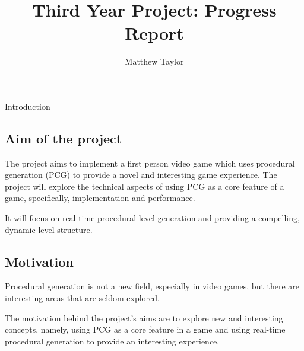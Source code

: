 \documentclass[progress]{cmpreport}
\title{Third Year Project: Progress Report}
\author{Matthew Taylor}
\begin{document}
\maketitle

\begin{section}{Introduction}

\subsection{Aim of the project}
The project aims to implement a first person video game which uses procedural generation (PCG) to provide a novel and interesting game experience. The project will explore the technical aspects of using PCG as a core feature of a game, specifically, implementation and performance. 

It will focus on real-time procedural level generation and providing a compelling, dynamic level structure.

\subsection{Motivation}
Procedural generation is not a new field, especially in video games, but there are interesting areas that are seldom explored.

The motivation behind the project's aims are to explore new and interesting concepts, namely, using PCG as a core feature in a game and using real-time procedural generation to provide an interesting experience.
   
\end{section}
\end{document}
